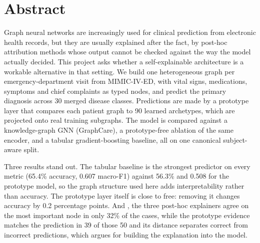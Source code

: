 \chapter*{Abstract}

Graph neural networks are increasingly used for clinical prediction from
electronic health records, but they are usually explained after the fact, by
post-hoc attribution methods whose output cannot be checked against the way the
model actually decided. This project asks whether a self-explainable
architecture is a workable alternative in that setting. We build one
heterogeneous graph per emergency-department visit from MIMIC-IV-ED, with
vital signs, medications, symptoms and chief complaints as typed nodes, and
predict the primary diagnosis across 30 merged disease classes. Predictions are
made by a prototype layer that compares each patient graph to 90 learned
archetypes, which are projected onto real training subgraphs. The model is
compared against a knowledge-graph GNN (GraphCare), a prototype-free ablation of
the same encoder, and a tabular gradient-boosting baseline, all on one canonical
subject-aware split.

Three results stand out. The tabular baseline is the strongest predictor on
every metric (65.4\% accuracy, 0.607 macro-F1) against 56.3\% and 0.508 for the
prototype model, so the graph structure used here adds interpretability rather
than accuracy. The prototype layer itself is close to free: removing it changes
accuracy by 0.2 percentage points. And , the three post-hoc
explainers agree on the most important node in only
32\% of the cases, while the prototype evidence matches the prediction in 39 of
those 50 and its distance separates correct from incorrect predictions, which
argues for building the explanation into the model.

